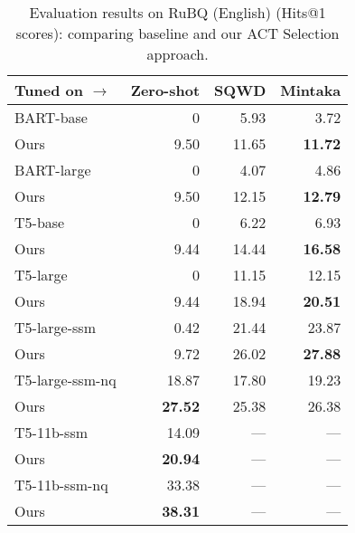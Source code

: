 \begin{table*}[ht]
    \caption{Evaluation results on RuBQ (English) (Hits@1 scores): comparing baseline and our ACT Selection approach.}
    \label{tab:act_selection:rubq}
    \centering
    \begin{tabular}{lrrr}
    \hline
    Tuned on $\rightarrow$ & Zero-shot & SQWD & Mintaka \\ \hline
    BART-base      & 0      & 5.93  & 3.72  \\
    Ours           & 9.50   & 11.65 & \textbf{11.72} \\ \hline
    BART-large     & 0      & 4.07  & 4.86  \\
    Ours           & 9.50   & 12.15 & \textbf{12.79} \\ \hline
    T5-base        & 0      & 6.22  & 6.93  \\
    Ours           & 9.44   & 14.44 & \textbf{16.58} \\ \hline
    T5-large       & 0      & 11.15 & 12.15 \\
    Ours           & 9.44   & 18.94 & \textbf{20.51} \\ \hline
    T5-large-ssm   & 0.42   & 21.44 & 23.87 \\
    Ours           & 9.72   & 26.02 & \textbf{27.88} \\ \hline
    T5-large-ssm-nq & 18.87 & 17.80 & 19.23 \\
    Ours           & \textbf{27.52} & 25.38 & 26.38 \\ \hline
    T5-11b-ssm     & 14.09  & ---   & ---   \\
    Ours           & \textbf{20.94} & --- & --- \\ \hline
    T5-11b-ssm-nq  & 33.38  & ---   & ---   \\
    Ours           & \textbf{38.31} & --- & --- \\ \hline
    \end{tabular}
\end{table*}


